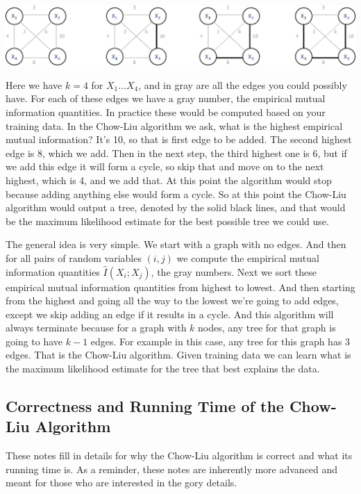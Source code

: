 {\centering\includegraphics[scale=0.4]{Chow_Liu4a} \par}

Here we have $k=4$ for $X_1 \dots X_4$, and in gray are all the edges you could possibly have. For each of these edges we have a gray number, the empirical mutual information quantities. In practice these would be computed based on your training data. In the Chow-Liu algorithm we ask, what is the highest empirical mutual information? It's 10, so that is first edge to be added. The second highest edge is 8, which we add. Then in the next step, the third highest one is 6, but if we add this edge it will form a cycle, so skip that and move on to the next highest, which is 4, and we add that. At this point the algorithm would stop because adding anything else would form a cycle. So at this point the Chow-Liu algorithm would output a tree, denoted by the solid black lines, and that would be the maximum likelihood estimate for the best possible tree we could use. 

The general idea is very simple. We start with a graph with no edges. And then for all pairs of random variables $(i,j)$ we compute the empirical mutual information quantities $\widehat{I}(X_i; X_j)$, the gray numbers. Next we sort these empirical mutual information quantities from highest to lowest. And then starting from the highest and going all the way to the lowest we're going to add edges, except we skip adding an edge if it results in a cycle. And this algorithm will always terminate because for a graph with $k$ nodes, any tree for that graph is going to have $k-1$ edges. For example in this case, any tree for this graph has 3 edges. That is the Chow-Liu algorithm. Given training data we can learn what is the maximum likelihood estimate for the tree that best explains the data. 


\subsection{Correctness and Running Time of the Chow-Liu Algorithm}

These notes fill in details for why the Chow-Liu algorithm is correct and what its running time is. As a reminder, these notes are inherently more advanced and meant for those who are interested in the gory details.

